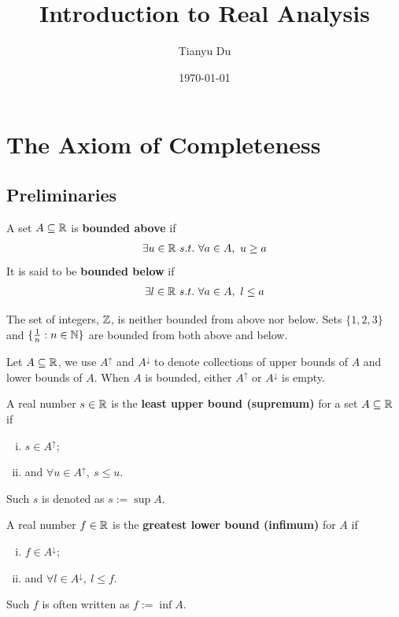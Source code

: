 \documentclass[11pt]{article}
\title{Introduction to Real Analysis}
\date{\today}
\author{Tianyu Du}
\begin{document}
	\maketitle
	\doclicenseThis
	\tableofcontents
	\newpage
	\section{The Axiom of Completeness}
	\subsection{Preliminaries}
	\begin{definition}
		A set $A \subseteq \mathbb{R}$ is \textbf{bounded above} if
		\begin{align}
			\exists u \in \mathbb{R}\ s.t.\ \forall a \in A,\ u \geq a
		\end{align} 
		It is said to be \textbf{bounded below} if
		\begin{align}
			\exists l \in \mathbb{R}\ s.t.\ \forall a \in A,\ l \leq a
		\end{align}
	\end{definition}
	
	\begin{example}
		The set of integers, $\mathbb{Z}$, is neither bounded from above nor below. Sets $\{1, 2, 3\}$ and $\{\frac{1}{n}: n \in \mathbb{N} \}$ are bounded from both above and below.
	\end{example}
	
	\begin{notation}
		Let $A \subseteq \mathbb{R}$, we use $A^\uparrow$ and $A^\downarrow$ to denote collections of upper bounds of $A$ and lower bounds of $A$. When $A$ is bounded, either $A^\uparrow$ or $A^\downarrow$ is empty.
	\end{notation}
	
	\begin{definition}
		A real number $s \in \mathbb{R}$ is the \textbf{least upper bound (supremum)} for a set $A \subseteq \mathbb{R}$ if 
		\begin{enumerate}[(i)]
			\item $s \in A^\uparrow$;
			\item and $\forall u \in A^\uparrow,\ s \leq u$.
		\end{enumerate} Such $s$ is denoted as $s := \sup A$.
	\end{definition}
	
	\begin{definition}
		A real number $f \in \mathbb{R}$ is the \textbf{greatest lower bound (infimum)} for $A$ if 
		\begin{enumerate}[(i)]
			\item $f \in A^\downarrow$;
			\item and $\forall l \in A^\downarrow,\ l \leq f$.	
		\end{enumerate}
		Such $f$ is often written as $f := \inf A$.
	\end{definition}
	
\end{document}

